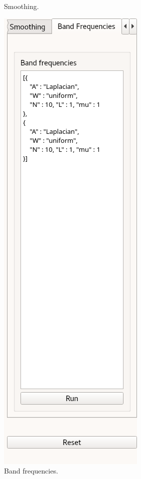 \documentclass[12pt]{article}
\begin{document}
\begin{figure}[H]
\begin{subfigure}{0.32\textwidth}
		\caption{Smoothing.}
		\label{fig:DV:smoothing}
	\end{subfigure}
	\begin{subfigure}{0.32\textwidth}
		\centering
		\includegraphics[scale=1]{DV-band-frequencies}
		\caption{Band frequencies.}
		\label{fig:DV:band-freqs}
	\end{subfigure}
	\begin{subfigure}{0.32\textwidth}
		\centering

\end{subfigure}
\end{figure}
\end{document}
